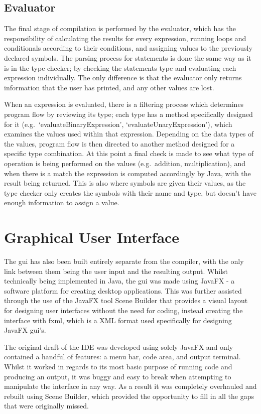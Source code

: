 \documentclass[
]{report}
\begin{document}
\subsection{Evaluator}
The final stage of compilation is performed by the evaluator, which has
the responsibility of calculating the results for every \gls{expression},
running loops and conditionals according to their conditions, and
assigning values to the previously declared \glspl{symbol}. The \gls{parsing} process
for \glspl{statement} is done the same way as it is in the type checker; by
checking the \glspl{statement} type and evaluating each \gls{expression}
individually. The only difference is that the evaluator only returns
information that the user has printed, and any other values are lost.

When an \gls{expression} is evaluated, there is a filtering process which
determines program flow by reviewing its type; each type has
a method specifically designed for it (e.g.~`evaluateBinaryExpression',
`evaluateUnaryExpression'), which examines the values used within that
\gls{expression}. Depending on the data types of the values, program flow is
then directed to another method designed for a specific type
combination. At this point a final check is made to see what type of
operation is being performed on the values (e.g.~addition,
multiplication), and when there is a match the \gls{expression} is computed
accordingly by Java, with the result being returned. This is also where
\glspl{symbol} are given their values, as the type checker only creates the
\glspl{symbol} with their name and type, but doesn't have enough information to
assign a value.

\section{Graphical User Interface}
The \acrshort{gui} has also been built entirely separate from the compiler, with
the only link between them being the user input and the resulting
output. Whilst technically being implemented in Java, the \acrshort{gui} was made
using JavaFX - a software platform for creating desktop applications.
This was further assisted through the use of the JavaFX tool Scene
Builder that provides a visual layout for designing user interfaces
without the need for coding, instead creating the interface with \acrshort{fxml},
which is a XML format used specifically for designing JavaFX \acrshort{gui}'s.

The original draft of the IDE was developed using solely JavaFX and only
contained a handful of features: a menu bar, code area, and output
terminal. Whilst it worked in regards to its most basic purpose of
running code and producing an output, it was buggy and easy to break
when attempting to manipulate the interface in any way. As a result it
was completely overhauled and rebuilt using Scene Builder, which
provided the opportunity to fill in all the gaps that were originally
missed.
\end{document}
